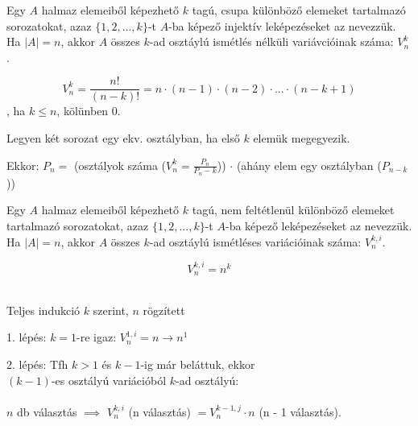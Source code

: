 \begin{frame}
  \begin{tcolorbox}[title={Def.:Ismétlés nélküli variáció}]
    Egy $A$ halmaz elemeiből képezhető $k$ tagú, csupa különböző elemeket tartalmazó sorozatokat, azaz $\{ 1, 2, ..., k \}$-t $A$-ba képező injektív leképezéseket az  nevezzük.\\
    Ha $|A| = n$, akkor $A$ összes $k$-ad osztáylú ismétlés nélküli variávcióinak száma: $V_n^k$.
  \end{tcolorbox}

  \begin{tcolorbox}[title={Tétel: Variációk száma}]
    $$V_n^k = \frac{n!}{(n - k)!} = n \cdot (n - 1) \cdot (n - 2) \cdot ... \cdot (n - k + 1)$$, ha $k \leq n$, kölünben 0.
  \tcblower
    \mmedskip
    
    Legyen két sorozat egy ekv. osztályban, ha első $k$ elemük megegyezik.\\
    \msmallskip
    
    Ekkor: $P_n = $ (osztályok száma ($V_n^k = \frac{P_n}{P_n - k}$)) $\cdot$ (ahány elem egy osztályban ($P_{n - k}$))
  \end{tcolorbox}
\end{frame}

\begin{frame}
  \begin{tcolorbox}[title={Def.: Ismétléses Variáció}]
    Egy $A$ halmaz elemeiből képezhető $k$ tagú, nem feltétlenül különböző elemeket tartalmazó sorozatokat, azaz $\{ 1, 2, ..., k \}$-t $A$-ba képező leképezéseket az  nevezzük.\\
    Ha $|A| = n$, akkor $A$ összes $k$-ad osztáylú ismétléses variációinak száma: $V_n^{k, i}$.
  \end{tcolorbox}

  \begin{tcolorbox}[title={Tétel: Ismétléses variációk száma}]
    $$V_n^{k, i} = n^k$$
  \tcblower
    \\
    \mmedskip

    Teljes indukció $k$ szerint, $n$ rögzített\\
    \msmallskip
    
    1. lépés: $k = 1$-re igaz: $V_n^{1, i} = n \rightarrow n^1$\\
    \msmallskip
    
    2. lépés: Tfh $k > 1$ és $k - 1$-ig már beláttuk, ekkor\\
    $(k - 1)$-es osztályú variációból $k$-ad osztályú:\\
    \msmallskip\\
    
    $n$ db választás $\implies$ $V_n^{k, i}$ (n választás) $= V_n^{k - 1, j} \cdot n$ (n - 1 választás).
  \end{tcolorbox}
\end{frame}

